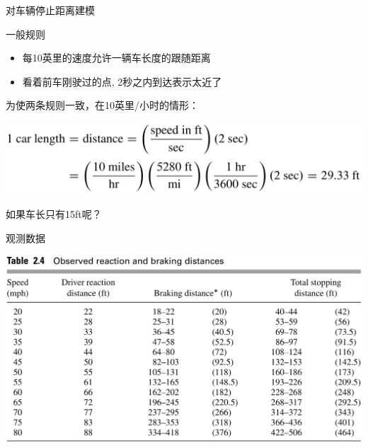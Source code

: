 \documentclass[UTF8, mathserif]{ctexbeamer}
\begin{document}
\begin{frame}{对车辆停止距离建模}
  \begin{block}{一般规则}
    \begin{itemize}
    \item 每10英里的速度允许一辆车长度的跟随距离
    \item 看着前车刚驶过的点, 2秒之内到达表示太近了
    \end{itemize}
  \end{block}

  为使两条规则一致，在10英里/小时的情形：

  \begin{center}
    \includegraphics[width=.6\textwidth{}]{carformula.png}
  \end{center}

  如果车长只有15ft呢？

\end{frame}

\begin{frame}{观测数据}
  \begin{center}
    \includegraphics[width=.8\textwidth{}]{cardata.png}
  \end{center}
\end{frame}
\end{document}
